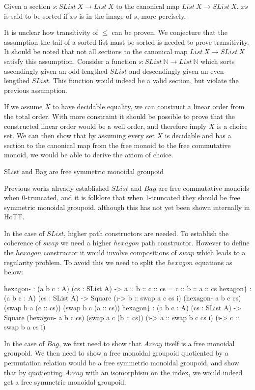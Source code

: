 \documentclass{article}
\newenvironment{code}{\verbatim}{\endverbatim}
\begin{document}
\begin{mydef}
    Given a section $s : SList \: X \rightarrow List \: X$ to the canonical map $List \: X \rightarrow SList \: X$,
    $xs$ is said to be sorted if $xs$ is in the image of $s$, more percisely, 
\end{mydef}

It is unclear how transitivity of $\leq$ can be proven. We conjecture that the assumption the tail of a sorted list
must be sorted is needed to prove transitivity. It should be noted that not all sections to the canonical map $List \: X \rightarrow SList \: X$
satisfy this assumption. Consider a function $s : SList \: \mathbb{N} \rightarrow List \: \mathbb{N}$ which sorts ascendingly given an odd-lengthed
$SList$ and descendingly given an even-lengthed $SList$. This function would indeed be a valid section, but violate the previous assumption.

If we assume $X$ to have decidable equality, we can construct a linear order from the total order.
With more constraint it should be possible to prove that the constructed linear order would be a well order, and therefore imply $X$ is a choice
set. We can then show that by assuming every set $X$ is decidable and has a section to the canonical map from the free monoid to the free commutative monoid, we
would be able to derive the axiom of choice.

\begin{myconj}
    SList and Bag are free symmetric monoidal groupoid
\end{myconj}
Previous works already established $SList$ and $Bag$ are free commutative
monoids when 0-truncated, and it is folklore that when 1-truncated they should be free symmetric monoidal groupoid, although
this has not yet been shown internally in HoTT. 

In the case of $SList$, higher path constructors are needed. To establish the coherence of $swap$ we need a higher $hexagon$
path constructor. However to define the $hexagon$ constructor it would involve compositions of $swap$ which leads to a regularity
problem. To avoid this we need to split the $hexagon$ equations as below:

\begin{code}
  hexagon- : (a b c : A) (cs : SList A)
           -> a :: b :: c :: cs = c :: b :: a :: cs
  hexagon↑ : (a b c : A) (cs : SList A)
           -> Square (\i -> b :: swap a c cs i) (hexagon- a b c cs)
                     (swap b a (c :: cs)) (swap b c (a :: cs))
  hexagon↓ : (a b c : A) (cs : SList A)
           -> Square (hexagon- a b c cs) (swap a c (b :: cs))
                     (\i -> a :: swap b c cs i) (\i -> c :: swap b a cs i)
\end{code}


In the case of $Bag$, we first need to show that $Array$ itself is a free monoidal groupoid. We then need to show a free
monoidal groupoid quotiented by a permutation relation would be a free symmetric monoidal groupoid, and show that by quotienting
$Array$ with an isomorphism on the index, we would indeed get a free symmetric monoidal groupoid.

\printbibliography
\end{document}
